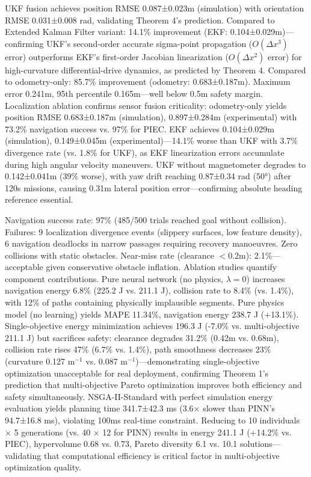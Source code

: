\documentclass[pdflatex,sn-nature]{sn-jnl}%
\begin{document}
UKF fusion achieves position RMSE 0.087±0.023m (simulation) with orientation RMSE 0.031±0.008 rad, validating Theorem 4's prediction. Compared to Extended Kalman Filter variant: 14.1\% improvement (EKF: 0.104±0.029m)—confirming UKF's second-order accurate sigma-point propagation ($O(\Delta x^3)$ error) outperforms EKF's first-order Jacobian linearization ($O(\Delta x^2)$ error) for high-curvature differential-drive dynamics, as predicted by Theorem 4. Compared to odometry-only: 85.7\% improvement (odometry: 0.683±0.187m). Maximum error 0.241m, 95th percentile 0.165m—well below 0.5m safety margin. Localization ablation confirms sensor fusion criticality: odometry-only yields position RMSE 0.683±0.187m (simulation), 0.897±0.284m (experimental) with 73.2\% navigation success vs. 97\% for PIEC. EKF achieves 0.104±0.029m (simulation), 0.149±0.045m (experimental)—14.1\% worse than UKF with 3.7\% divergence rate (vs. 1.8\% for UKF), as EKF linearization errors accumulate during high angular velocity maneuvers. UKF without magnetometer degrades to 0.142±0.041m (39\% worse), with yaw drift reaching 0.87±0.34 rad (50°) after 120s missions, causing 0.31m lateral position error—confirming absolute heading reference essential.

Navigation success rate: 97\% (485/500 trials reached goal without collision). Failures: 9 localization divergence events (slippery surfaces, low feature density), 6 navigation deadlocks in narrow passages requiring recovery manoeuvres. Zero collisions with static obstacles. Near-miss rate (clearance $<0.2$m): 2.1\%—acceptable given conservative obstacle inflation. Ablation studies quantify component contributions. Pure neural network (no physics, $\lambda=0$) increases navigation energy 6.8\% (225.2 J vs. 211.1 J), collision rate to 8.4\% (vs. 1.4\%), with 12\% of paths containing physically implausible segments. Pure physics model (no learning) yields MAPE 11.34\%, navigation energy 238.7 J (+13.1\%). Single-objective energy minimization achieves 196.3 J (-7.0\% vs. multi-objective 211.1 J) but sacrifices safety: clearance degrades 31.2\% (0.42m vs. 0.68m), collision rate rises 47\% (6.7\% vs. 1.4\%), path smoothness decreases 23\% (curvature 0.127 m$^{-1}$ vs. 0.087 m$^{-1}$)—demonstrating single-objective optimization unacceptable for real deployment, confirming Theorem 1's prediction that multi-objective Pareto optimization improves both efficiency and safety simultaneously. NSGA-II-Standard with perfect simulation energy evaluation yields planning time 341.7±42.3 ms (3.6× slower than PINN's 94.7±16.8 ms), violating 100ms real-time constraint. Reducing to 10 individuals × 5 generations (vs. 40 × 12 for PINN) results in energy 241.1 J (+14.2\% vs. PIEC), hypervolume 0.68 vs. 0.73, Pareto diversity 6.1 vs. 10.1 solutions—validating that computational efficiency is critical factor in multi-objective optimization quality.
\end{document}
